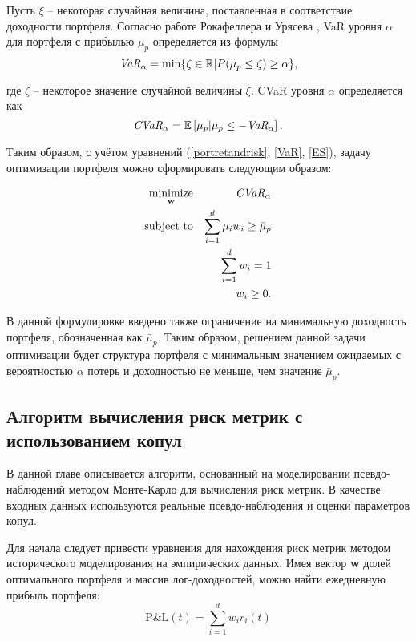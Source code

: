 Пусть $\xi$ -- некоторая случайная величина, поставленная в соответствие доходности портфеля.
Согласно работе Рокафеллера и Урясева \cite{Rock2000}, VaR уровня $\alpha$ для портфеля с прибылью $\mu_p$ определяется из формулы
%
\begin{equation} \label{VaR}
    \emph{VaR}_\alpha = \text{min}\{\zeta \in \mathbb{R}|P(\mu_p \le \zeta) \ge \alpha \},
\end{equation}

\noindent где $\zeta$ -- некоторое значение случайной величины $\xi$. CVaR уровня $\alpha$ определяется как
%
\begin{equation} \label{ES}
    \emph{CVaR}_\alpha = \mathbb{E}\left[\mu_p | \mu_p \le -\emph{VaR}_\alpha \right].
\end{equation}

Таким образом, с учётом уравнений (\ref{portretandrisk}, \ref{VaR}, \ref{ES}), задачу оптимизации портфеля можно сформировать следующим образом:

\begin{eqnarray}\label{minES}
\underset{\textbf{w}}{\text{minimize}} & & \emph{CVaR}_\alpha \\
\text{subject to} & & \sum_{i=1}^d \mu_i w_i \ge \bar{\mu}_p \nonumber \\
& & \sum_{i=1}^d w_i = 1 \nonumber \\
& & w_i \ge 0. \nonumber
\end{eqnarray}

В данной формулировке введено также ограничение на минимальную доходность портфеля, обозначенная как $\bar{\mu}_p$.
Таким образом, решением данной задачи оптимизации будет структура портфеля с минимальным значением ожидаемых с вероятностью $\alpha$ потерь и доходностью не меньше, чем значение $\bar{\mu}_p$.

\subsection{Алгоритм вычисления риск метрик с использованием копул}

В данной главе описывается алгоритм, основанный на моделировании псевдо-наблюдений методом Монте-Карло для вычисления риск метрик. 
В качестве входных данных используются реальные псевдо-наблюдения и оценки параметров копул.

Для начала следует привести уравнения для нахождения риск метрик методом исторического моделирования на эмпирических данных. 
Имея вектор \textbf{w} долей оптимального портфеля и массив лог-доходностей, можно найти ежедневную прибыль портфеля:
%
\begin{equation} \label{PnL}
    \text{P\&L}(t) = \sum_{i=1}^d w_i r_i(t)
\end{equation}

